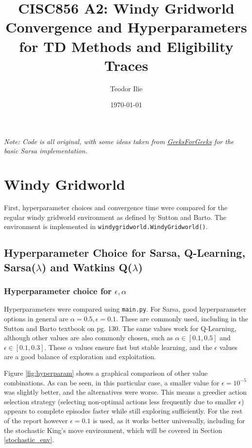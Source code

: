 \documentclass{article}
\title{CISC856 A2: Windy Gridworld Convergence and Hyperparameters for TD Methods and Eligibility Traces}
\author{Teodor Ilie}
\date{\today}
\newcommand{\code}[1]{\texttt{#1}}
\begin{document}
\maketitle

\textit{Note: Code is all original, with some ideas taken from \href{https://www.geeksforgeeks.org/sarsa-reinforcement-learning/}{GeeksForGeeks} for the basic Sarsa implementation.}

\section{Windy Gridworld}\label{standard_env}
First, hyperparameter choices and convergence time were compared for the regular windy gridworld environment as defined by Sutton and Barto. The environment is implemented in \code{windygridworld.WindyGridworld()}.

\subsection{Hyperparameter Choice for Sarsa, Q-Learning, Sarsa($\lambda$) and Watkins Q($\lambda$)}

\subsubsection{Hyperparameter choice for $\epsilon, \alpha$}

Hyperparameters were compared using \code{main.py}. For Sarsa, good hyperparameter options in general are $\alpha = 0.5, \epsilon = 0.1$. These are commonly used, including in the Sutton and Barto textbook on pg. 130. The same values work for Q-Learning, although other values are also commonly chosen, such as $\alpha \in [0.1, 0.5]$ and $\epsilon \in [0.1, 0.3]$. These $\alpha$ values ensure fast but stable learning, and the $\epsilon$ values are a good balance of exploration and exploitation. 

Figure \ref{fig:hyperparam} shows a graphical comparison of other value combinations. As can be seen, in this particular case, a smaller value for $\epsilon=10^{-5}$ was slightly better, and the alternatives were worse. This means a greedier action selection strategy (selecting non-optimal actions less frequently due to smaller $\epsilon$) appears to complete episodes faster while still exploring sufficiently. For the rest of the report however $\epsilon=0.1$ is used, as it works better universally, including for the stochastic King's move environment, which will be covered in Section \ref{stochastic_env}.
\end{document}
